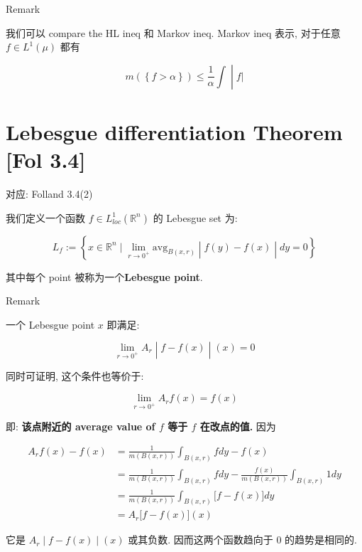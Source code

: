 \begin{qlremark}{Remark}

我们可以 compare the HL ineq 和 Markov ineq. Markov ineq 表示, 对于任意 \(f \in L^{1}(\mu)\) 都有

\[\left. m(\left\{ {f > \alpha} \right\}) \leq \frac{1}{\alpha}\int \middle| f| \right.\]

\end{qlremark}

\section{Lebesgue differentiation Theorem {[}Fol 3.4{]}}

对应: Folland 3.4(2)

\begin{definition}{}

我们定义一个函数 \(f \in L_{loc}^{1}(\mathbb{R}^{n})\) 的 Lebesgue set 为:

\[L_{f} := \left\{ x \in \mathbb{R}^{n} \mid \lim\limits_{r\rightarrow 0^{+}}\text{avg}_{B(x,r)} \middle| f(y) - f(x) \middle| dy = 0 \right\}\]

其中每个 point 被称为一个\textbf{Lebesgue point}.

\end{definition}

\begin{qlremark}{Remark}

一个 Lebesgue point \(x\) 即满足:

\[\left. \lim\limits_{r\rightarrow 0^{+}}A_{r} \middle| f - f(x) \middle| (x) = 0 \right.\]

同时可证明, 这个条件也等价于:

\[\lim\limits_{r\rightarrow 0^{+}}A_{r}f(x) = f(x)\]

即: \textbf{该点附近的 average value of \(f\) 等于 \(f\) 在改点的值.} 因为

\[\begin{matrix}
{A_{r}f(x) - f(x)} & {= \frac{1}{m(B(x,r))}\int_{B(x,r)}f dy - f(x)} \\
 & {= \frac{1}{m(B(x,r))}\int_{B(x,r)}f dy - \frac{f(x)}{m(B(x,r))}\int_{B(x,r)}1 dy} \\
 & {= \frac{1}{m(B(x,r))}\int_{B(x,r)}\lbrack f - f(x)\rbrack dy} \\
 & {= A_{r}\lbrack f - f(x)\rbrack(x)}
\end{matrix}\]

它是 \(\left. A_{r} \middle| f - f(x) \middle| (x) \right.\) 或其负数. 因而这两个函数趋向于 0 的趋势是相同的.

\end{qlremark}

